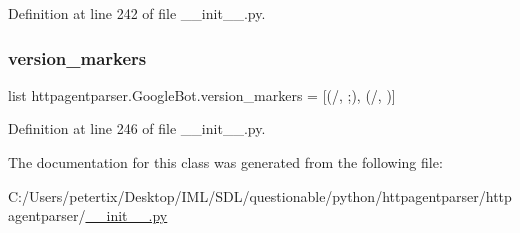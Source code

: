 Definition at line 242 of file \+\_\+\+\_\+init\+\_\+\+\_\+.\+py.

\hypertarget{classhttpagentparser_1_1_google_bot_ad164588f023484c9c15320a36027ebcb}{}\label{classhttpagentparser_1_1_google_bot_ad164588f023484c9c15320a36027ebcb} 
\subsubsection{\texorpdfstring{version\+\_\+markers}{version\_markers}}
{\footnotesize\ttfamily list httpagentparser.\+Google\+Bot.\+version\+\_\+markers = \mbox{[}(\textquotesingle{}/\textquotesingle{}, \textquotesingle{};\textquotesingle{}), (\textquotesingle{}/\textquotesingle{}, \textquotesingle{} \textquotesingle{})\mbox{]}\hspace{0.3cm}{\ttfamily [static]}}



Definition at line 246 of file \+\_\+\+\_\+init\+\_\+\+\_\+.\+py.



The documentation for this class was generated from the following file\+:\begin{DoxyCompactItemize}
\item 
C\+:/\+Users/petertix/\+Desktop/\+I\+M\+L/\+S\+D\+L/questionable/python/httpagentparser/httpagentparser/\hyperlink{____init_____8py}{\+\_\+\+\_\+init\+\_\+\+\_\+.\+py}\end{DoxyCompactItemize}
